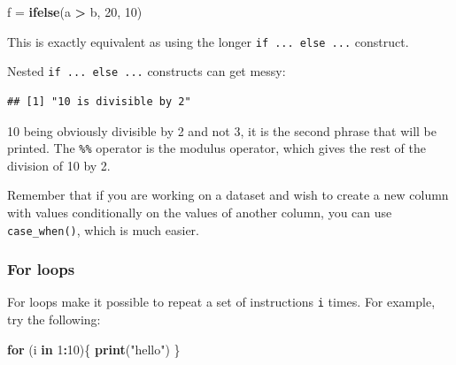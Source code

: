 \documentclass[]{gitbook}
\newenvironment{Shaded}{\begin{snugshade}}{\end{snugshade}}
\newcommand{\ControlFlowTok}[1]{\textcolor[rgb]{0.13,0.29,0.53}{\textbf{#1}}}
\newcommand{\DecValTok}[1]{\textcolor[rgb]{0.00,0.00,0.81}{#1}}
\newcommand{\KeywordTok}[1]{\textcolor[rgb]{0.13,0.29,0.53}{\textbf{#1}}}
\newcommand{\NormalTok}[1]{#1}
\newcommand{\OperatorTok}[1]{\textcolor[rgb]{0.81,0.36,0.00}{\textbf{#1}}}
\newcommand{\StringTok}[1]{\textcolor[rgb]{0.31,0.60,0.02}{#1}}
\begin{document}
\begin{Shaded}
\begin{Highlighting}[]
\NormalTok{f =}\StringTok{ }\KeywordTok{ifelse}\NormalTok{(a }\OperatorTok{>}\StringTok{ }\NormalTok{b, }\DecValTok{20}\NormalTok{, }\DecValTok{10}\NormalTok{)}
\end{Highlighting}
\end{Shaded}

This is exactly equivalent as using the longer \texttt{if\ ...\ else\ ...} construct.

Nested \texttt{if\ ...\ else\ ...} constructs can get messy:

\begin{Shaded}
\end{Shaded}

\begin{verbatim}
## [1] "10 is divisible by 2"
\end{verbatim}

10 being obviously divisible by 2 and not 3, it is the second phrase that will be printed. The
\texttt{\%\%} operator is the modulus operator, which gives the rest of the division of 10 by 2.

Remember that if you are working on a dataset and wish to create a new column with values
conditionally on the values of another column, you can use \texttt{case\_when()}, which is much easier.

\hypertarget{for-loops}{%
\subsubsection{For loops}\label{for-loops}}

For loops make it possible to repeat a set of instructions \texttt{i} times. For example, try the following:

\begin{Shaded}
\begin{Highlighting}[]
\ControlFlowTok{for}\NormalTok{ (i }\ControlFlowTok{in} \DecValTok{1}\OperatorTok{:}\DecValTok{10}\NormalTok{)\{}
  \KeywordTok{print}\NormalTok{(}\StringTok{"hello"}\NormalTok{)}
\NormalTok{\}}
\end{Highlighting}
\end{Shaded}
\end{document}
